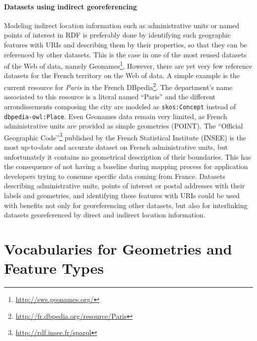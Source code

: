 \paragraph{Datasets using indirect georeferencing}
Modeling indirect location information such as administrative units or named points of interest in RDF is preferably done by identifying such geographic features with URIs and describing them by their properties, so that they can be referenced by other datasets. This is the case in one of the most reused datasets of the Web of data, namely Geonames\footnote{\url{http://sws.geonames.org/}}. However, there are yet very few reference datasets for the French territory on the Web of data.  A simple example is the current resource for \textit{Paris} in the French DBpedia\footnote{\url{http://fr.dbpedia.org/resource/Paris}}. The department's name associated to this resource is a literal named ``Paris'' and the different arrondissements composing the city are modeled as \texttt{skos:Concept} instead of \texttt{dbpedia-owl:Place}. Even Geonames data remain very limited, as French administrative units are provided as simple geometries (POINT). The ``Official Geographic Code''\footnote{\url{http://rdf.insee.fr/sparql}} published by the French Statistical Institute (INSEE) is the most up-to-date and accurate dataset on French administrative units, but unfortunately it contains no geometrical description of their boundaries. This has the consequence of not having a baseline during mapping process for application developers trying to consume specific data coming from France. Datasets describing administrative units, points of interest or postal addresses with their labels and geometries, and identifying these features with URIs could be used with benefits not only for georeferencing other datasets, but also for interlinking datasets georeferenced by direct and indirect location information.







\section{Vocabularies for Geometries and Feature Types} \label{sec:geomfeaturevocab}


